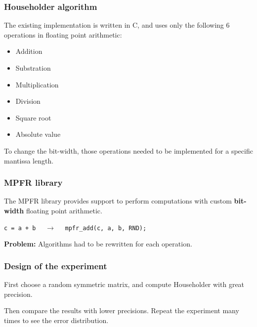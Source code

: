\documentclass[serif, 12pt]{beamer}
\begin{document}
\begin{frame}
\frametitle{Householder algorithm}

The existing implementation is written in C, and uses only the following 6 
operations in floating point arithmetic:

\begin{itemize}
\item Addition
\item Substration
\item Multiplication
\item Division
\item Square root
\item Absolute value
\end{itemize}

\pause

To change the bit-width, those operations needed to be implemented for a 
specific mantissa length.

\end{frame}


\begin{frame}
\frametitle{MPFR library}
The MPFR library provides support to perform computations with custom 
\textbf{bit-width} floating point arithmetic.

\vspace{1em}

\texttt{c = a + b} $\quad \rightarrow \quad$ \texttt{mpfr\_add(c, a, b, RND);}

\vspace{1em}
\pause
\textbf{Problem:} Algorithms had to be rewritten for each operation.
\end{frame}


\begin{frame}
\frametitle{Design of the experiment}

First choose a random symmetric matrix, and compute Householder with great 
precision.

Then compare the results with lower precisions. Repeat the experiment many times 
to see the error distribution.

\vspace{1em}

\begin{algorithmic}[0]
\ENDFOR
\ENDFOR
\end{algorithmic}
\end{frame}
\end{document}
